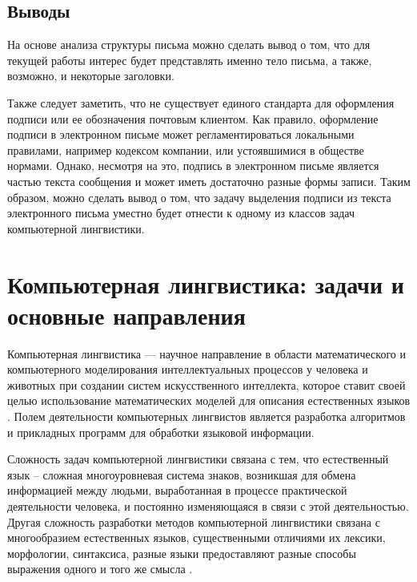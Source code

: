 


\subsection{Выводы}
На основе анализа структуры письма можно сделать вывод о том, что для текущей работы интерес будет представлять именно тело письма, а также, возможно, и некоторые заголовки.

Также следует заметить, что не существует единого стандарта для оформления подписи или ее обозначения почтовым клиентом. Как правило, оформление подписи в электронном письме может регламентироваться локальными правилами, например кодексом компании, или устоявшимися в обществе нормами. Однако, несмотря на это, подпись в электронном письме является частью текста сообщения и может иметь достаточно разные формы записи. Таким образом, можно сделать вывод о том, что задачу выделения подписи из текста электронного письма уместно будет отнести к одному из классов задач компьютерной лингвистики.

\newpage
\section{Компьютерная лингвистика: задачи и основные направления}

Компьютерная лингвистика — научное направление в области математического и компьютерного моделирования интеллектуальных процессов у человека и животных при создании систем искусственного интеллекта, которое ставит своей целью использование математических моделей для описания естественных языков \cite{wiki-comp-ling}.
Полем деятельности компьютерных лингвистов является разработка алгоритмов и прикладных программ для обработки языковой информации.

Сложность задач компьютерной лингвистики связана с тем, что естественный язык – сложная многоуровневая система
знаков, возникшая для обмена информацией между людьми, выработанная в процессе практической деятельности человека, и постоянно изменяющаяся в связи с этой деятельностью. Другая сложность разработки методов компьютерной лингвистики связана с многообразием естественных языков, существенными отличиями их лексики, морфологии, синтаксиса, разные языки предоставляют разные способы выражения одного и того же смысла \cite{Posobie}.

